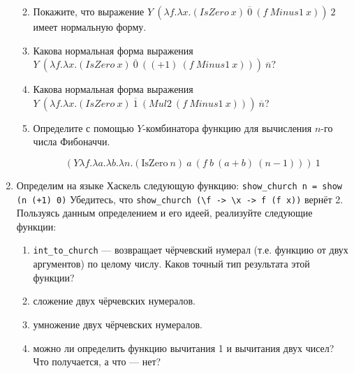 \begin{enumerate}
\begin{enumerate}
\begin{solution}
                    \end{solution}
              \item Покажите, что выражение $Y\ (\lambda f.\lambda x.(IsZero\ x)\ \overline{0}\ (f\ Minus1\ x))\ 2$ имеет нормальную форму.
              \item Какова нормальная форма выражения $Y\ (\lambda f.\lambda x.(IsZero\ x)\ \overline{0}\ ((+1)\ (f\ Minus1\ x)))\ \overline{n}$?
              \item Какова нормальная форма выражения $Y\ (\lambda f.\lambda x.(IsZero\ x)\ \overline{1}\ (Mul2\ (f\ Minus1\ x)))\ \overline{n}$?
              \item Определите с помощью $Y$-комбинатора функцию для вычисления $n$-го числа Фибоначчи.
                    \begin{solution}
                        \[(Y \lambda f.\lambda a.\lambda b.\lambda n.(\mathrm{IsZero}\ n)\ a\ (f\ b\ (a + b)\ (n - 1)))\ 1\]
                    \end{solution}
          \end{enumerate}

    \item Определим на языке Хаскель следующую функцию: \verb!show_church n = show (n (+1) 0)!
          Убедитесь, что \verb!show_church (\f -> \x -> f (f x))! вернёт 2.
          Пользуясь данным определением и его идеей, реализуйте следующие функции:

          \begin{enumerate}
              \item \verb!int_to_church! --- возвращает чёрчевский нумерал (т.е. функцию от двух аргументов) по целому числу.
                    Каков точный тип результата этой функции?
              \item сложение двух чёрчевских нумералов.
              \item умножение двух чёрчевских нумералов.
              \item можно ли определить функцию вычитания 1 и вычитания двух чисел? Что получается, а что --- нет?
          \end{enumerate}


\end{enumerate}
